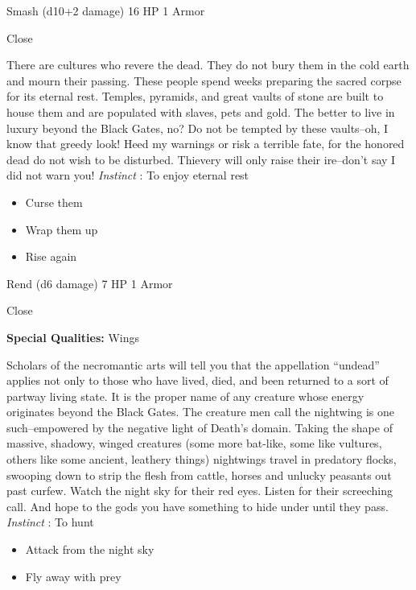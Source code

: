 

 Smash (d10+2 damage) 16 HP 1 Armor


 Close


 There are cultures who revere the dead. They do not bury them in the cold earth and mourn their passing. These people spend weeks preparing the sacred corpse for its eternal rest. Temples, pyramids, and great vaults of stone are built to house them and are populated with slaves, pets and gold. The better to live in luxury beyond the Black Gates, no? Do not be tempted by these vaults--oh, I know that greedy look! Heed my warnings or risk a terrible fate, for the honored dead do not wish to be disturbed. Thievery will only raise their ire--don't say I did not warn you! \emph{Instinct}
: To enjoy eternal rest
\begin{itemize}
\item Curse them
\item Wrap them up
\item Rise again

\end{itemize}




 Rend (d6 damage) 7 HP 1 Armor


 Close


 \textbf{Special Qualities:}
 Wings


 Scholars of the necromantic arts will tell you that the appellation ``undead'' applies not only to those who have lived, died, and been returned to a sort of partway living state. It is the proper name of any creature whose energy originates beyond the Black Gates. The creature men call the nightwing is one such--empowered by the negative light of Death's domain. Taking the shape of massive, shadowy, winged creatures (some more bat-like, some like vultures, others like some ancient, leathery things) nightwings travel in predatory flocks, swooping down to strip the flesh from cattle, horses and unlucky peasants out past curfew. Watch the night sky for their red eyes. Listen for their screeching call. And hope to the gods you have something to hide under until they pass. \emph{Instinct}
: To hunt
\begin{itemize}
\item Attack from the night sky
\item Fly away with prey

\end{itemize}


